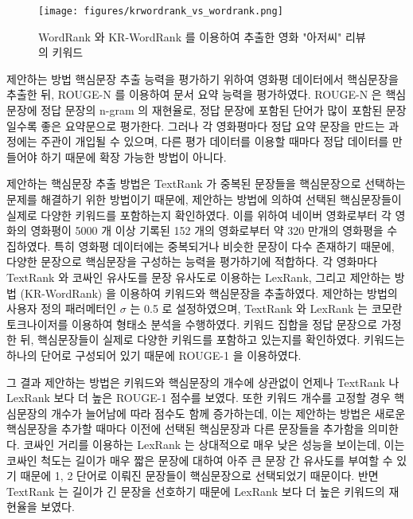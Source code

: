 \documentclass[11pt]{article}
\begin{document}
\begin{figure}[H]
\centering
\label{fig:krwordrank_vs_wordrank}
\texttt{[image: figures/krwordrank\_vs\_wordrank.png]}
\caption{WordRank 와 KR-WordRank 를 이용하여 추출한 영화 "아저씨" 리뷰의 키워드}
\end{figure}

제안하는 방법 핵심문장 추출 능력을 평가하기 위하여 영화평 데이터에서 핵심문장을 추출한 뒤, ROUGE-N \citep{lin2004rouge} 를 이용하여 문서 요약 능력을 평가하였다.
ROUGE-N 은 핵심문장에 정답 문장의 n-gram 의 재현율로, 정답 문장에 포함된 단어가 많이 포함된 문장일수록 좋은 요약문으로 평가한다.
그러나 각 영화평마다 정답 요약 문장을 만드는 과정에는 주관이 개입될 수 있으며, 다른 평가 데이터를 이용할 때마다 정답 데이터를 만들어야 하기 때문에 확장 가능한 방법이 아니다.

제안하는 핵심문장 추출 방법은 TextRank 가 중복된 문장들을 핵심문장으로 선택하는 문제를 해결하기 위한 방법이기 때문에, 제안하는 방법에 의하여 선택된 핵심문장들이 실제로 다양한 키워드를 포함하는지 확인하였다.
이를 위하여 네이버 영화로부터 각 영화의 영화평이 5000 개 이상 기록된 152 개의 영화로부터 약 320 만개의 영화평을 수집하였다.
특히 영화평 데이터에는 중복되거나 비슷한 문장이 다수 존재하기 때문에, 다양한 문장으로 핵심문장을 구성하는 능력을 평가하기에 적합하다.
각 영화마다 TextRank 와 코싸인 유사도를 문장 유사도로 이용하는 LexRank, 그리고 제안하는 방법 (KR-WordRank) 을 이용하여 키워드와 핵심문장을 추출하였다.
제안하는 방법의 사용자 정의 패러메터인 $\sigma$ 는 0.5 로 설정하였으며, TextRank 와 LexRank 는 코모란 토크나이저를 이용하여 형태소 분석을 수행하였다.
키워드 집합을 정답 문장으로 가정한 뒤, 핵심문장들이 실제로 다양한 키워드를 포함하고 있는지를 확인하였다.
키워드는 하나의 단어로 구성되어 있기 때문에 ROUGE-1 을 이용하였다.

그 결과 제안하는 방법은 키워드와 핵심문장의 개수에 상관없이 언제나 TextRank 나 LexRank 보다 더 높은 ROUGE-1 점수를 보였다.
또한 키워드 개수를 고정할 경우 핵심문장의 개수가 늘어남에 따라 점수도 함께 증가하는데, 이는 제안하는 방법은 새로운 핵심문장을 추가할 때마다 이전에 선택된 핵심문장과 다른 문장들을 추가함을 의미한다.
코싸인 거리를 이용하는 LexRank 는 상대적으로 매우 낮은 성능을 보이는데, 이는 코싸인 척도는 길이가 매우 짧은 문장에 대하여 아주 큰 문장 간 유사도를 부여할 수 있기 때문에 1, 2 단어로 이뤄진 문장들이 핵심문장으로 선택되었기 때문이다.
반면 TextRank 는 길이가 긴 문장을 선호하기 때문에 LexRank 보다 더 높은 키워드의 재현율을 보였다.
\end{document}
